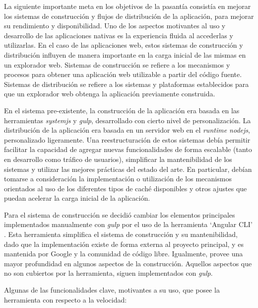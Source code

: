 La siguiente importante meta en los objetivos de la pasantía consistía en mejorar los sistemas de construcción y flujos de distribución de la aplicación, para mejorar su rendimiento y disponibilidad. Uno de los aspectos motivantes al uso y desarrollo de las aplicaciones nativas es la experiencia fluida al accederlas y utilizarlas. En el caso de las aplicaciones web, estos sistemas de construcción y distribución influyen de manera importante en la carga inicial de las mismas en un explorador web. Sistemas de construcción se refiere a los mecanismos y procesos para obtener una aplicación web utilizable a partir del código fuente. Sistemas de distribución se refiere a los sistemas y plataformas establecidos para que un explorador web obtenga la aplicación previamente construida.

En el sistema pre-existente, la construcción de la aplicación era basada en las herramientas \textit{systemjs} y \textit{gulp}, desarrollado con cierto nivel de personalización. La distribución de la aplicación era basada en un servidor web en el \textit{runtime nodejs}, personalizado ligeramente. Una reestructuración de estos sistemas debía permitir facilitar la capacidad de agregar nuevas funcionalidades de forma escalable (tanto en desarrollo como tráfico de usuarios), simplificar la mantenibilidad de los sistemas y utilizar las mejores prácticas del estado del arte. En particular, debían tomarse a consideración la implementación o utilización de los mecanismos orientados al uso de los diferentes tipos de caché disponibles y otros ajustes que puedan acelerar la carga inicial de la aplicación.

Para el sistema de construcción se decidió cambiar los elementos principales implementados manualmente con \textit{gulp} por el uso de la herramienta `Angular CLI' \cite{angularcli}. Esta herramienta simplifica el sistema de construcción y su mantenibilidad, dado que la implementación existe de forma externa al proyecto principal, y es mantenida por Google y la comunidad de código libre. Igualmente, provee una mayor profundidad en algunos aspectos de la construcción. Aquellos aspectos que no son cubiertos por la herramienta, siguen implementados con \textit{gulp}.

Algunas de las funcionalidades clave, motivantes a su uso, que posee la herramienta con respecto a la velocidad:

